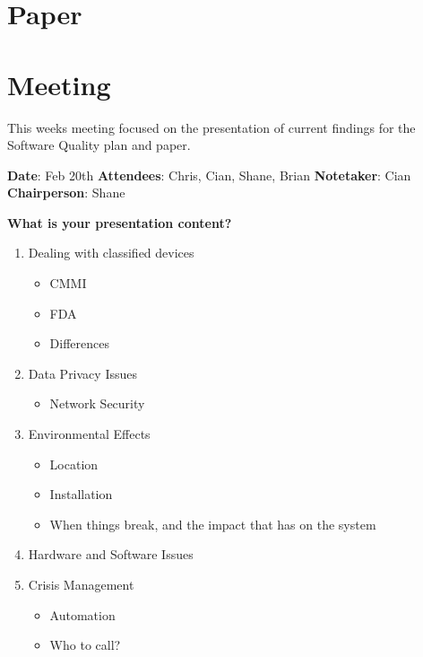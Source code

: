 \section{Paper}

\section{Meeting}

This weeks meeting focused on the presentation of current findings for the Software Quality plan and paper.

\textbf{Date}: Feb 20th\newline
\textbf{Attendees}: Chris, Cian, Shane, Brian\newline
\textbf{Notetaker}: Cian\newline
\textbf{Chairperson}: Shane\newline \newline

\textbf{What is your presentation content?}
\begin{enumerate}
\item Dealing with classified devices
\begin{itemize}
\item CMMI
\item FDA
\item Differences
\end{itemize}
\item Data Privacy Issues
\begin{itemize}
\item Network Security
\end{itemize}
\item Environmental Effects
\begin{itemize}
\item Location
\item Installation
\item When things break, and the impact that has on the system
\end{itemize}
\item Hardware and Software Issues
\item Crisis Management
\begin{itemize}
\item Automation
\item Who to call?
\end{itemize}
\end{enumerate}

